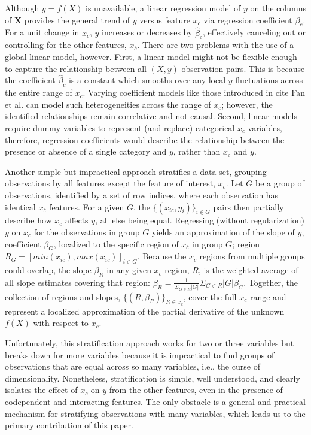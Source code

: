 \documentclass[12pt]{article}
\newcommand{\xnc}{$x_{\overline{c}}$}
\begin{document}
Although $y = f(X)$ is unavailable, a linear regression model of $y$ on the columns of $\mathbf{X}$ provides the general trend of $y$ versus feature $x_c$ via regression coefficient $\beta_c$. For a unit change in $x_c$, $y$ increases or decreases by $\widehat{\beta}_c$, effectively canceling out or controlling for the other features, \xnc. There are two problems with the use of a global linear model, however.  First, a linear model might not be flexible enough to capture the relationship between all $(X,y)$ observation pairs. This is because the coefficient $\widehat{\beta}_c$ is a constant which smooths over any local $y$ fluctuations across the entire range of $x_c$. Varying coefficient models like those introduced in {\color{red} cite Fan et al.} can model such heterogeneities across the range of $x_c$; however, the identified relationships remain correlative and not causal. Second, linear models require dummy variables to represent (and replace) categorical $x_c$ variables, therefore, regression coefficients would describe the relationship between the presence or absence of a single category and $y$, rather than $x_c$ and $y$. 

Another simple but impractical approach stratifies a data set, grouping observations by all features except the feature of interest, $x_c$.  Let $G$ be a group of observations, identified by a set of row indices, where each observation has identical \xnc{} features. For a given $G$, the $\{(x_{ic},  y_i)\}_{i \in G}$ pairs then partially describe how $x_c$ affects $y$, all else being equal.  Regressing (without regularization) $y$ on $x_c$ for the observations in group $G$ yields an approximation of the slope of $y$, coefficient $\beta_G$, localized to the specific region of \xnc{} in group $G$; region $R_G = [min(x_{ic}), max(x_{ic})]_{i \in G}$. Because the $x_c$ regions from multiple groups could overlap, the slope $\beta_R$ in any given $x_c$ region, $R$, is the weighted average of all slope estimates covering that region: $\beta_R = \frac{1}{\Sigma_{G \in R} |G|}\Sigma_{G \in R}|G|\beta_G$. Together, the collection of regions and slopes, $\{(R, \beta_R)\}_{R \in x_c}$, cover the full $x_c$ range and represent a localized approximation of the partial derivative of the unknown $f(X)$ with respect to $x_c$.

Unfortunately, this stratification approach works for two or three variables but breaks down for more variables because it is impractical to find groups of observations that are equal across so many variables, i.e., the curse of dimensionality.  Nonetheless, stratification is simple, well understood, and clearly isolates the effect of $x_c$ on $y$ from the other features, even in the presence of codependent and interacting features.  The only obstacle is a general and practical mechanism for stratifying observations with many variables, which leads us to the primary contribution of this paper.
\end{document}
